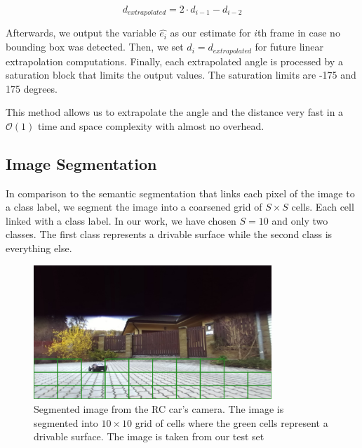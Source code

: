 \documentclass{ctuthesis/ctuthesis}
\begin{document}
\begin{equation}
d_{extrapolated} = 2\cdot d_{i-1} - d_{i-2}
\end{equation}

Afterwards, we output the variable $\hat{e_{i}}$ as our estimate for $i$th frame in case no bounding box was detected. Then, we set $d_i = d_{extrapolated}$ for future linear extrapolation computations. Finally, each extrapolated angle is processed by a saturation block that limits the output values. The saturation limits are -175 and 175 degrees. \par


This method allows us to extrapolate the angle and the distance very fast in a $\mathcal{O}(1)$ time and space complexity with almost no overhead.




\subsection{Image Segmentation}\label{s:Image_Segmentation}
In comparison to the semantic segmentation that links each pixel of the image to a class label, we segment the image into a coarsened grid of $S\times S$ cells. Each cell linked with a class label. In our work, we have chosen $S=10$ and only two classes. The first class represents a drivable surface while the second class is everything else. \par


\begin{figure}[h!]
    \centering
    \includegraphics[width=0.8\textwidth]{images/segmented_image.png}
    
    \caption{Segmented image from the RC car's camera. The image is segmented into $10\times 10$ grid of cells where the green cells represent a drivable surface. The image is taken from our test set}\label{f:segmented_image}
\end{figure}
\end{document}
